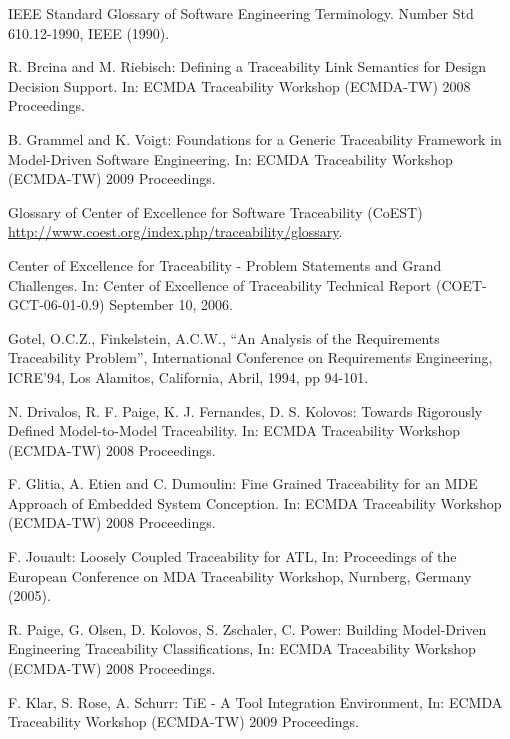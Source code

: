 \documentclass[a4paper,12pt,twoside,spanish,openright]{book}
\begin{document}

\begin{thebibliography}{26}


 IEEE Standard Glossary of Software Engineering Terminology. Number Std 610.12-1990, IEEE (1990).

 R. Brcina and M. Riebisch: Defining a Traceability Link Semantics for Design Decision Support. In: ECMDA Traceability Workshop (ECMDA-TW) 2008 Proceedings.

 B. Grammel and K. Voigt: Foundations for a Generic Traceability Framework in Model-Driven Software Engineering. In: ECMDA Traceability Workshop (ECMDA-TW) 2009 Proceedings.

 Glossary of Center of Excellence for Software Traceability (CoEST) \url{http://www.coest.org/index.php/traceability/glossary}.

 Center of Excellence for Traceability - Problem Statements and Grand Challenges. In: Center of Excellence of Traceability Technical Report (COET-GCT-06-01-0.9) September 10, 2006.

 Gotel, O.C.Z., Finkelstein, A.C.W., “An Analysis of the Requirements Traceability Problem”, International Conference on Requirements Engineering, ICRE’94, Los Alamitos, California, Abril, 1994, pp 94-101.

 N. Drivalos, R. F. Paige, K. J. Fernandes, D. S. Kolovos: Towards Rigorously Defined Model-to-Model Traceability. In: ECMDA Traceability Workshop (ECMDA-TW) 2008 Proceedings.

 F. Glitia, A. Etien and C. Dumoulin: Fine Grained Traceability for an MDE Approach of Embedded System Conception. In: ECMDA Traceability Workshop (ECMDA-TW) 2008 Proceedings.

 F. Jouault: Loosely Coupled Traceability for ATL, In: Proceedings of the European Conference on MDA Traceability Workshop, Nurnberg, Germany (2005).

 R. Paige, G. Olsen, D. Kolovos, S. Zschaler, C. Power: Building Model-Driven Engineering Traceability Classifications, In: ECMDA Traceability Workshop (ECMDA-TW) 2008 Proceedings.

 F. Klar, S. Rose, A. Schurr: TiE - A Tool Integration Environment, In: ECMDA Traceability Workshop (ECMDA-TW) 2009 Proceedings.


\end{thebibliography}
\end{document}
